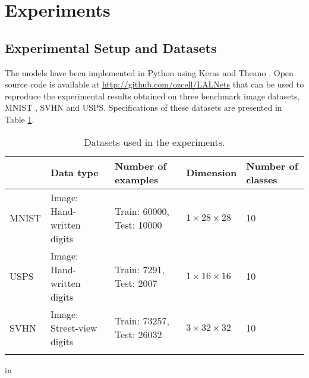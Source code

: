 \documentclass{article} \usepackage{iclr2018_conference,times}
\newcommand{\ra}[1]{\renewcommand{\arraystretch}{#1}}
\begin{document}
\section{Experiments}
\subsection{Experimental Setup and Datasets}
The models have been implemented in Python using Keras \citep{chollet2015keras} and Theano \citep{Theano}. Open source code is available at \hyperref{http://github.com/ozcell/LALNets}{}{}{http://github.com/ozcell/LALNets} that can be used to reproduce the experimental results obtained on three benchmark image datasets, MNIST \citep{lecun1998mnist}, SVHN \citep{svhn} and USPS. Specifications of these datasets are presented in Table \ref{tab:pseudo_datasets}.

\begin{table}[h]\centering
\ra{1.2}
\caption{Datasets used in the experiments.}
\resizebox{\columnwidth}{!} {
\begin{tabular}{@{}lllll@{}}\toprule
		& Data type 				& Number of examples 			& Dimension 				& Number of classes \\
\midrule
MNIST 	&Image: Hand-written digits & Train: 60000, Test: 10000		& $1\times28\times28$		& 10				\\
USPS 	&Image: Hand-written digits & Train: 7291, Test: 2007		& $1\times16\times16$		& 10				\\
SVHN	&Image: Street-view digits 	& Train: 73257, Test: 26032 	& $3\times32\times32$		& 10				\\
\bottomrule
\label{tab:pseudo_datasets}
\end{tabular}
}
 in
\end{table}
\end{document}
